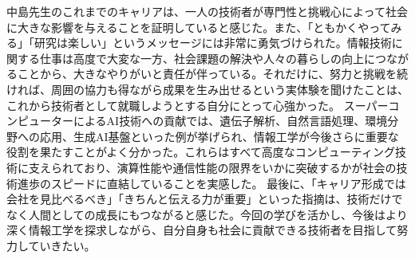 \documentclass[autodetect-engine,dvi=dvipdfmx,ja=standard,
               a4j,11pt]{bxjsarticle}
\begin{document}
中島先生のこれまでのキャリアは、一人の技術者が専門性と挑戦心によって社会に大きな影響を与えることを証明していると感じた。また、「ともかくやってみる」「研究は楽しい」というメッセージには非常に勇気づけられた。情報技術に関する仕事は高度で大変な一方、社会課題の解決や人々の暮らしの向上につながることから、大きなやりがいと責任が伴っている。それだけに、努力と挑戦を続ければ、周囲の協力も得ながら成果を生み出せるという実体験を聞けたことは、これから技術者として就職しようとする自分にとって心強かった。
スーパーコンピューターによるAI技術への貢献では、遺伝子解析、自然言語処理、環境分野への応用、生成AI基盤といった例が挙げられ、情報工学が今後さらに重要な役割を果たすことがよく分かった。これらはすべて高度なコンピューティング技術に支えられており、演算性能や通信性能の限界をいかに突破するかが社会の技術進歩のスピードに直結していることを実感した。
最後に、「キャリア形成では会社を見比べるべき」「きちんと伝える力が重要」といった指摘は、技術だけでなく人間としての成長にもつながると感じた。今回の学びを活かし、今後はより深く情報工学を探求しながら、自分自身も社会に貢献できる技術者を目指して努力していきたい。
\end{document}
